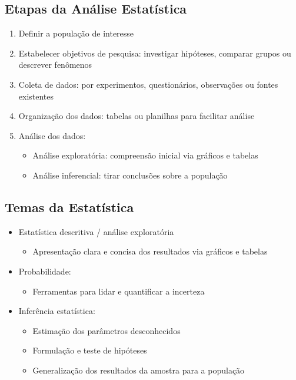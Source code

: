 \documentclass[12pt]{article}
\begin{document}
    \subsection{Etapas da Análise Estatística}
    \begin{enumerate}
        \item Definir a população de interesse
        \item Estabelecer objetivos de pesquisa: investigar hipóteses, comparar 
        grupos ou descrever fenômenos
        \item Coleta de dados: por experimentos, questionários, observações ou 
        fontes existentes
        \item Organização dos dados: tabelas ou planilhas para facilitar análise
        \item Análise dos dados:
        \begin{itemize}
            \item Análise exploratória: compreensão inicial via gráficos e tabelas
            \item Análise inferencial: tirar conclusões sobre a população
        \end{itemize}
    \end{enumerate}
    \subsection{Temas da Estatística}
    \begin{itemize}
        \item Estatística descritiva / análise exploratória
        \begin{itemize}
            \item Apresentação clara e concisa dos resultados via gráficos e 
            tabelas
        \end{itemize}
        \item Probabilidade:
        \begin{itemize}
            \item Ferramentas para lidar e quantificar a incerteza
        \end{itemize}
        \item Inferência estatística:
        \begin{itemize}
            \item Estimação dos parâmetros desconhecidos
            \item Formulação e teste de hipóteses
            \item Generalização dos resultados da amostra para a população
        \end{itemize}
    \end{itemize}
\end{document}

